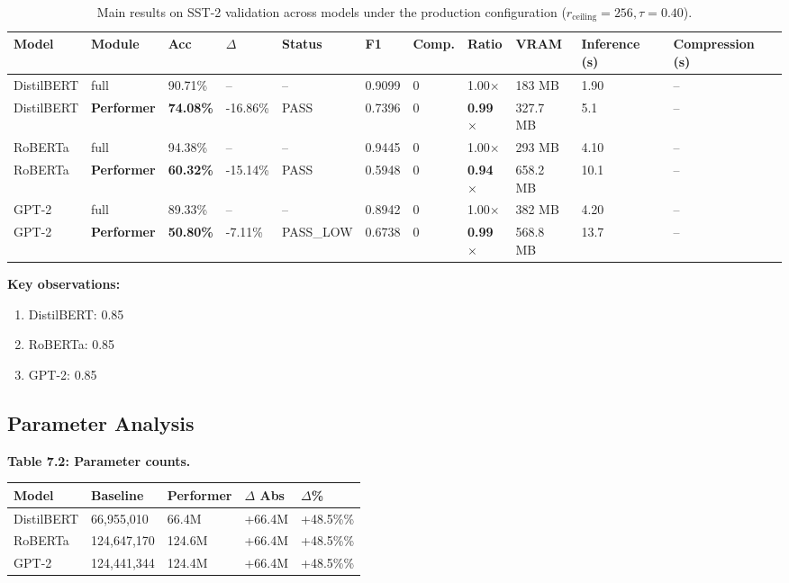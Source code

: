 \begin{table}[t]
\centering
\small
\begin{tabular}{lllllllllll}
\toprule
\textbf{Model} & \textbf{Module} & \textbf{Acc} & \textbf{$\Delta$} & \textbf{Status} & \textbf{F1} & \textbf{Comp.} & \textbf{Ratio} & \textbf{VRAM} & \textbf{Inference (s)} & \textbf{Compression (s)} \\
\midrule
DistilBERT & full & 90.71\% & -- & -- & 0.9099 & 0 & 1.00$\times$ & 183 MB & 1.90 & -- \\
DistilBERT & \textbf{Performer} & \textbf{74.08\%} & -16.86\% & PASS & 0.7396 & 0 & \textbf{0.99$\times$} & 327.7 MB & 5.1 & -- \\
RoBERTa & full & 94.38\% & -- & -- & 0.9445 & 0 & 1.00$\times$ & 293 MB & 4.10 & -- \\
RoBERTa & \textbf{Performer} & \textbf{60.32\%} & -15.14\% & PASS & 0.5948 & 0 & \textbf{0.94$\times$} & 658.2 MB & 10.1 & -- \\
GPT-2 & full & 89.33\% & -- & -- & 0.8942 & 0 & 1.00$\times$ & 382 MB & 4.20 & -- \\
GPT-2 & \textbf{Performer} & \textbf{50.80\%} & -7.11\% & PASS_LOW & 0.6738 & 0 & \textbf{0.99$\times$} & 568.8 MB & 13.7 & -- \\
\bottomrule
\end{tabular}
\caption{Main results on SST-2 validation across models under the production configuration ($r_{\mathrm{ceiling}}=256, \tau=0.40$).}
\label{tab:main_sst2}
\end{table}

\textbf{Key observations:}

\begin{enumerate}
\item DistilBERT: 0.85
\item RoBERTa: 0.85
\item GPT-2: 0.85

\end{enumerate}
\subsection{Parameter Analysis}

\textbf{Table 7.2: Parameter counts.}

\begin{table}[H]
\centering
\small
\begin{tabular}{lllll}
\toprule
\textbf{Model} & \textbf{Baseline} & \textbf{Performer} & \textbf{$\Delta$ Abs} & \textbf{$\Delta$\%} \\
\midrule
DistilBERT & 66,955,010 & 66.4M & +66.4M & +48.5\%\% \\
RoBERTa & 124,647,170 & 124.6M & +66.4M & +48.5\%\% \\
GPT-2 & 124,441,344 & 124.4M & +66.4M & +48.5\%\% \\
\bottomrule
\end{tabular}
\end{table}


